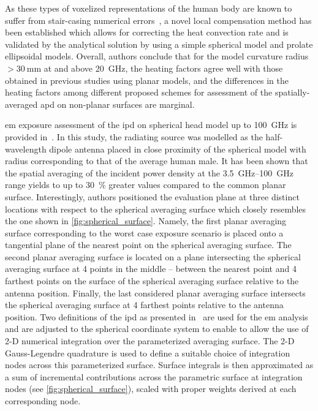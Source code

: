 As these types of voxelized representations of the human body are known to suffer from stair-casing numerical errors~\cite{Poljak2018On}, a novel local compensation method has been established which allows for correcting the heat convection rate and is validated by the analytical solution by using a simple spherical model and prolate ellipsoidal models. 
Overall, authors conclude that for the model curvature radius $> \SI{30}{\mm}$ at and above \SI{20}{\GHz}, the heating factors agree well with those obtained in previous studies using planar models, and the differences in the heating factors among different proposed schemes for assessment of the spatially-averaged \gls{apd} on non-planar surfaces are marginal.

\Gls{em} exposure assessment of the \gls{ipd} on spherical head model up to \SI{100}{\GHz} is provided in~\cite{Kapetanovic2022AssessmentTEMC}.
In this study, the radiating source was modelled as the half-wavelength dipole antenna placed in close proximity of the spherical model with radius corresponding to that of the average human male.
It has been shown that the spatial averaging of the incident power density at the \SIrange[range-units=single,range-phrase=--]{3.5}{100}{\GHz} range yields to up to \SI{30}{\percent} greater values compared to the common planar surface.
Interestingly, authors positioned the evaluation plane at three distinct locations with respect to the spherical averaging surface which closely resembles the one shown in \cref{fig:spherical_surface}.
Namely, the first planar averaging surface corresponding to the worst case exposure scenario is placed onto a tangential plane of the nearest point on the spherical averaging surface.
The second planar averaging surface is located on a plane intersecting the spherical averaging surface at 4 points in the middle – between the nearest point and 4 farthest points on the surface of the spherical averaging surface relative to the antenna position.
Finally, the last considered planar averaging surface intersects the spherical averaging surface at 4 farthest points relative to the antenna position.
Two definitions of the \gls{ipd} as presented in~\cite{IEEE2021Guide} are used for the \gls{em} analysis and are adjusted to the spherical coordinate system to enable to allow the use of 2-D numerical integration over the parameterized averaging surface.
The 2-D Gauss-Legendre quadrature is used to define a suitable choice of integration nodes across this parameterized surface. Surface integrals is then approximated as a sum of incremental contributions across the parametric surface at integration nodes (see \cref{fig:spherical_surface}), scaled with proper weights derived at each corresponding node.

